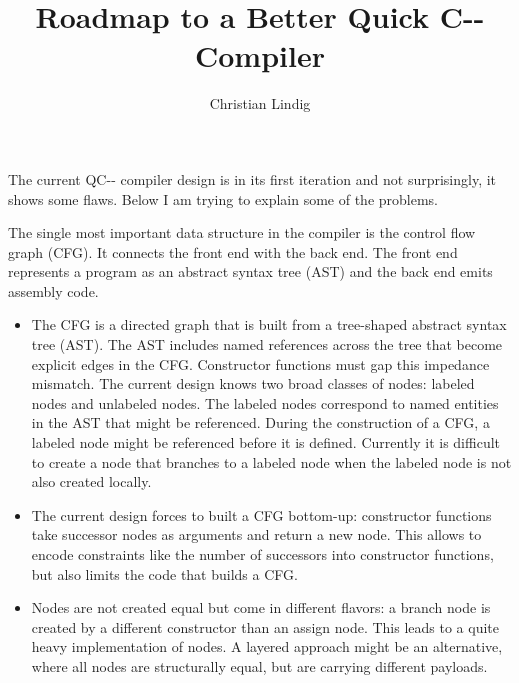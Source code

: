 \documentclass[11pt]{article}
\author{Christian Lindig}
\title{Roadmap to a Better Quick C-{}- Compiler}
\newcommand\AST{{\small AST}}
\newcommand\CFG{{\small CFG}}
\newcommand\qcc{{\small QC-{}-}}
\begin{document}

\maketitle

The current {\qcc} compiler design is in its first iteration and not
surprisingly, it shows some flaws. Below I am trying to explain some of
the problems.

The single most important data structure in the compiler is the
control flow graph (\CFG). It connects the front end with the back end.
The front end represents a program as an abstract syntax tree (\AST) and
the back end emits assembly code. 

    \begin{itemize} 
    \item The {\CFG} is a directed graph that is built from a
    tree-shaped abstract syntax tree (\AST). The {\AST} includes named
    references across the tree that become explicit edges in the {\CFG}.
    Constructor functions must gap this impedance mismatch. The current
    design knows two broad classes of nodes: labeled nodes and unlabeled
    nodes. The labeled nodes correspond to named entities in the {\AST}
    that might be referenced. During the construction of a {\CFG}, a
    labeled node might be referenced before it is defined.  Currently it
    is difficult to create a node that branches to a labeled node when
    the labeled node is not also created locally. 
    
    \item The current design forces to built a {\CFG} bottom-up:
    constructor functions take successor nodes as arguments and return a
    new node. This allows to encode constraints like the number of
    successors into constructor functions, but also limits the code
    that builds a {\CFG}.
    
    \item Nodes are not created equal but come in different flavors: a
    branch node is created by a different constructor than an assign
    node. This leads to a quite heavy implementation of nodes. A layered
    approach might be an alternative, where all nodes are structurally
    equal, but are carrying different payloads.
    

\end{itemize}
\end{document}
